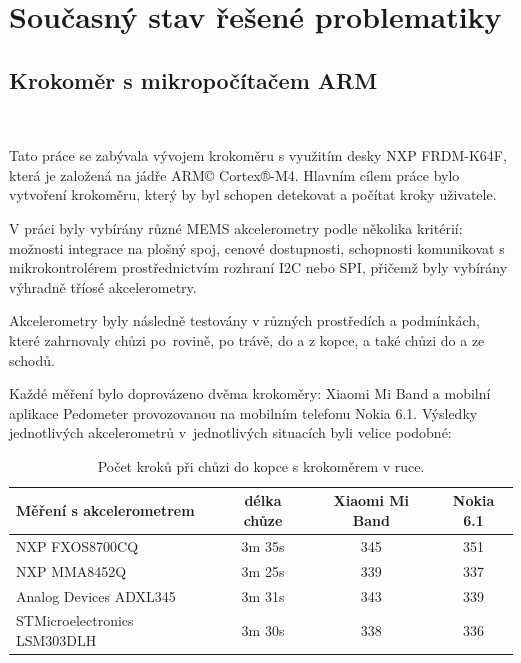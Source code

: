 \chapter{Současný stav řešené problematiky}
\vspace{-20pt}

\section{Krokoměr s mikropočítačem ARM}\

Tato práce se zabývala vývojem krokoměru s využitím desky NXP FRDM-K64F, která je založená na jádře ARM© Cortex®-M4. Hlavním cílem práce bylo vytvoření krokoměru, který by byl schopen detekovat a počítat kroky uživatele.

V práci byly vybírány různé MEMS akcelerometry podle několika kritérií: možnosti integrace na plošný spoj, cenové dostupnosti, schopnosti komunikovat s mikrokontrolérem prostřednictvím rozhraní I2C nebo SPI, přičemž byly vybírány výhradně tříosé akcelerometry.

Akcelerometry byly následně testovány v různých prostředích a podmínkách, které zahrnovaly chůzi po~rovině, po trávě, do a z kopce, a také chůzi do a ze schodů.

Každé měření bylo doprovázeno dvěma krokoměry:  Xiaomi Mi Band a mobilní aplikace Pedometer provozovanou na mobilním telefonu Nokia 6.1. Výsledky jednotlivých akcelerometrů v~jednotlivých situacích byli velice podobné:

\begin{table}[!htbp]
	\centering
	\begin{tabular}{lccc}
		\toprule
		Měření s akcelerometrem      & délka chůze & Xiaomi Mi Band & Nokia 6.1 \\
		\midrule
		NXP FXOS8700CQ               & 3m 35s      & 345            & 351       \\
		NXP MMA8452Q                 & 3m 25s      & 339            & 337       \\
		Analog Devices ADXL345       & 3m 31s      & 343            & 339       \\
		STMicroelectronics LSM303DLH & 3m 30s      & 338            & 336       \\
		\bottomrule
	\end{tabular}
	\caption{Počet kroků při chůzi do kopce s krokoměrem v ruce.}
	\label{tab:1}
	\vspace{-15pt}
\end{table}

